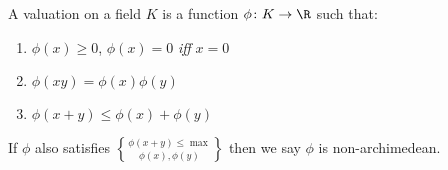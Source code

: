  A valuation on a field $K$ is a function $\phi\colon K\to\R$ such that:
\begin{enumerate}[label=(\arabic*)]
\item $\phi(x)\geq0$, $\phi(x)=0$ \emph{iff} $x=0$
\item $\phi(xy)=\phi(x)\phi(y)$
\item $\phi(x+y)\leq\phi(x)+\phi(y)$
\end{enumerate}
If $\phi$ also satisfies $\phi(x+y)\leq\max\brace{\phi(x),\phi(y)}$ then we say $\phi$ is non-archimedean.

